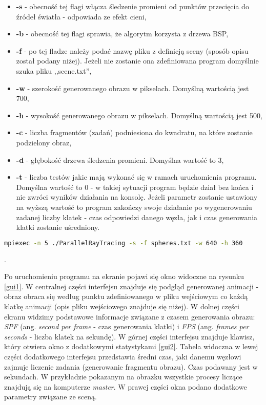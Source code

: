 \begin{itemize}

\item \textbf{-s} - obecność tej flagi włącza śledzenie promieni od punktów przecięcia do źródeł światła - odpowiada ze efekt cieni,
\item \textbf{-b} - obecność tej flagi sprawia, że algorytm korzysta z drzewa BSP,
\item \textbf{-f} - po tej fladze należy podać nazwę pliku z definicją sceny (sposób opisu został podany niżej). Jeżeli nie zostanie ona zdefiniowana program domyślnie szuka pliku ,,scene.txt'',
\item \textbf{-w} - szerokość generowanego obrazu w pikselach. Domyślną wartością jest 700,
\item \textbf{-h} - wysokość generowanego obrazu w pikselach. Domyślną wartością jest 500,
\item \textbf{-c} - liczba fragmentów (zadań) podniesiona do kwadratu, na które zostanie podzielony obraz,
\item \textbf{-d} - głębokość drzewa śledzenia promieni. Domyślna wartość to 3,
\item \textbf{-t} - liczba testów jakie mają wykonać się w ramach uruchomienia programu. Domyślna wartość to 0 - w takiej sytuacji program będzie dział bez końca i nie zwróci wyników działania na konsolę. Jeżeli parametr zostanie ustawiony na wyższą wartość to program zakończy swoje działanie po wygenerowaniu zadanej liczby klatek - czas odpowiedzi danego węzła, jak i czas generowania klatki zostanie uśredniony.

\end{itemize}

\begin{lstlisting}[language=bash, caption={Przykładowe uruchomienie programu}]
mpiexec -n 5 ./ParallelRayTracing -s -f spheres.txt -w 640 -h 360
\end{lstlisting}.

Po uruchomieniu programu na ekranie pojawi się okno widoczne na rysunku \ref{gui1}. W centralnej części interfejsu znajduje się podgląd generowanej animacji - obraz obraca się według punktu zdefiniowanego w pliku wejściowym co każdą klatkę animacji (opis pliku wejściowego znajduje się niżej). W dolnej części ekranu widzimy podstawowe informacje związane z czasem generowania obrazu: \emph{SPF} (ang. \emph{second per frame} - czas generowania klatki) i \emph{FPS} (ang. \emph{frames per seconds} - liczba klatek na sekundę). W górnej części interfejsu znajduje klawisz, który otwiera okno z dodatkowymi statystykami \ref{gui2}. Tabela widoczna w lewej części dodatkowego interfejsu przedstawia średni czas, jaki danemu węzłowi zajmuje liczenie zadania (generowanie fragmentu obrazu). Czas podawany jest w sekundach. W przykładzie pokazanym na obrazku wszystkie procesy liczące znajdują się na komputerze \emph{master}. W prawej części okna podano dodatkowe parametry związane ze sceną.

